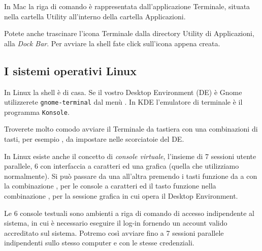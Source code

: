 In Mac la riga di comando è rappresentata dall'applicazione \textsf{Terminale}, situata nella cartella Utility all'interno della cartella Applicazioni.

Potete anche trascinare l’icona Terminale dalla directory Utility di Applicazioni, alla \emph{Dock Bar}. Per avviare la shell fate click sull'icona appena creata.

\subsection{I sistemi operativi Linux}

In Linux la shell è di casa. Se il vostro Desktop Environment (DE) è Gnome utilizzerete \texttt{gnome-terminal} dal menù . In KDE l'emulatore di terminale è il programma \texttt{Konsole}.

Troverete molto comodo avviare il Terminale da tastiera con una combinazioni di tasti, per esempio , da impostare nelle scorciatoie del DE.

In Linux esiste anche il concetto di \emph{console virtuale}, l'insieme di 7 sessioni utente parallele, 6 con interfaccia a caratteri ed una grafica (quella che utilizziamo normalmente). Si può passare da una all'altra premendo i tasti funzione da  a  con la combinazione , per le console a caratteri ed il tasto funzione  nella combinazione , per la sessione grafica in cui opera il Desktop Environment.

Le 6 console testuali sono ambienti a riga di comando di accesso indipendente al sistema, in cui è necessario eseguire il log-in fornendo un account valido accreditato sul sistema. Potremo così avviare fino a 7 sessioni parallele indipendenti sullo stesso computer e con le stesse credenziali.









